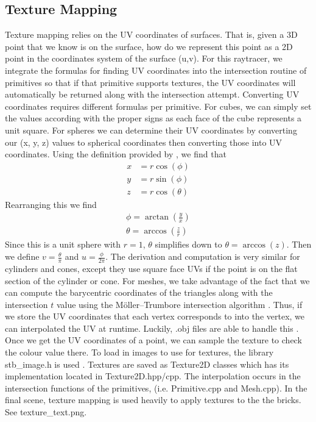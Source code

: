 \documentclass {article}
\begin{document}
\subsection{Texture Mapping}
Texture mapping relies on the UV coordinates of surfaces. That is, given a 3D point that
we know is on the surface, how do we represent this point as a 2D point in the coordinates system
of the surface (u,v). For this raytracer, we integrate the formulas for finding UV coordinates 
into the intersection routine of primitives so that if that primitive supports textures, the
UV coordinates will automatically be returned along with the intersection attempt. Converting
UV coordinates requires different formulas per primitive. For cubes, we can simply set the
values according with the proper signs as each face of the cube represents a unit square. For spheres
we  can determine their UV coordinates by converting our (x, y, z) values to spherical coordinates then
converting those into UV coordinates. 
Using the definition provided by \cite{PBR}, we find that
\begin{align*}
    x&=r\cos (\phi)\\
    y&=r\sin (\phi)\\
    z&=r\cos(\theta)
\end{align*}
Rearranging this we find
\begin{align*}
    \phi = \arctan(\frac{y}{x})\\
    \theta = \arccos(\frac{z}{r})
\end{align*}
Since this is a unit sphere with $r=1$, $\theta$ simplifies down to $\theta = \arccos(z)$. Then we
define $v=\frac{\theta}{\pi}$ and $u=\frac{\phi}{2\pi}$. The derivation and computation is very similar
for cylinders and cones, except they use square face UVs if the point is on the flat section of the cylinder
or cone. For meshes, we take advantage of the fact that we can compute the barycentric coordinates of the
triangles along with the intersection $t$ value using the Möller–Trumbore intersection algorithm \cite{mtrumbore_1997}.
Thus, if we store the UV coordinates that each vertex corresponds to into the vertex, we can interpolated
the UV at runtime. Luckily, .obj files are able to handle this \cite{murray_vanryper_1996}. Once
we get the UV coordinates of a point, we can sample the texture to check the colour value there. To load in images
to use for textures, the library stb\_image.h is used \cite{barrett_2020}. Textures are saved as Texture2D classes
which has its implementation located in Texture2D.hpp/cpp. The interpolation occurs in the intersection functions
of the primitives, (i.e. Primitive.cpp
and Mesh.cpp). In the final scene, texture mapping is used heavily to apply textures to the the bricks.
See texture\_text.png.
\end{document}
